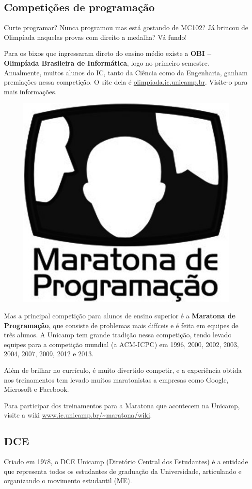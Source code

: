 \subsection{Competições de programação}

Curte programar? Nunca programou mas está gostando de MC102? Já brincou de
Olimpíada naquelas provas com direito a medalha? Vá fundo!

Para os bixos que ingressaram direto do ensino médio existe a \textbf{OBI --
Olimpíada Brasileira de Informática}, logo no primeiro semestre.  Anualmente,
muitos alunos do IC, tanto da Ciência como da Engenharia, ganham premiações
nessa competição. O site dela é \url{olimpiada.ic.unicamp.br}.  Visite-o para
mais informações.

\begin{figure}[h!]
    \centering
    \includegraphics[width=.35\textwidth]{img/alem_da_graduacao/maratona_logo.png}
\end{figure}

Mas a principal competição para alunos de ensino superior é a \textbf{Maratona
de Programação}, que consiste de problemas mais difíceis e é feita em equipes de
três alunos. A Unicamp tem grande tradição nessa competição, tendo levado
equipes para a competição mundial (a ACM-ICPC) em 1996, 2000, 2002, 2003, 2004,
2007, 2009, 2012 e 2013.

Além de brilhar no currículo, é muito divertido competir, e a experiência obtida
nos treinamentos tem levado muitos maratonistas a empresas como Google,
Microsoft e Facebook.

Para participar dos treinamentos para a Maratona que acontecem na Unicamp,
visite a wiki \url{www.ic.unicamp.br/~maratona/wiki}.

\subsection{DCE}

Criado em 1978, o DCE Unicamp (Diretório Central dos Estudantes) é a entidade
que representa todos os estudantes de graduação da Universidade, articulando e
organizando o movimento estudantil (ME).

